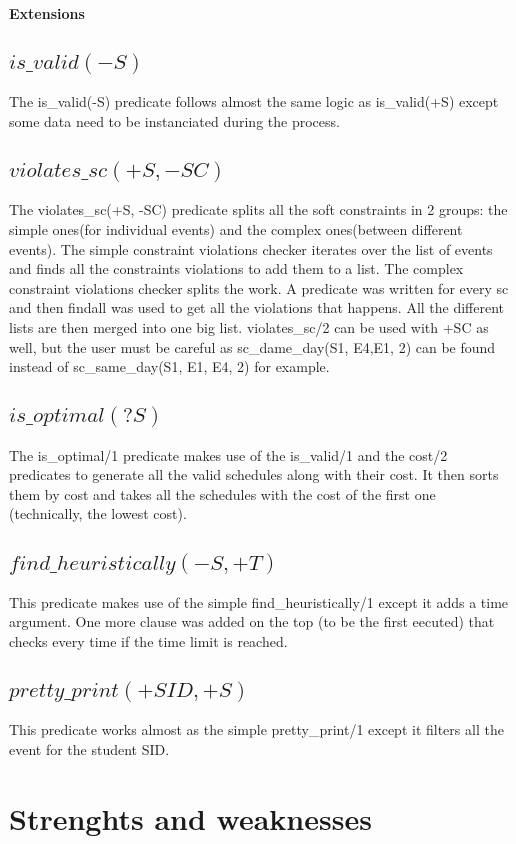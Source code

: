 \documentclass[a4paper]{article}
\begin{document}
\textbf{Extensions}

\subsection{$is\_valid(-S)$}
The is\_valid(-S) predicate follows almost the same logic as is\_valid(+S) except some data need to be instanciated during the process.
\subsection{$violates\_sc(+S, -SC)$}
The violates\_sc(+S, -SC) predicate splits all the soft constraints in 2 groups: the simple ones(for individual events) and the complex ones(between different events).
The simple constraint violations checker iterates over the list of events and finds all the constraints violations to add them to a list. The complex constraint violations checker splits the work. A predicate was written for every sc and then findall was used to get all the violations that happens. All the different lists are then merged into one big list. 
violates\_sc/2 can be used with +SC as well, but the user must be careful as sc_dame_day(S1, E4,E1, 2) can be found instead of sc_same_day(S1, E1, E4, 2) for example.
\subsection{$is\_optimal(?S)$}
The is\_optimal/1 predicate makes use of the is\_valid/1 and the cost/2 predicates to generate all the valid schedules along with their cost. It then sorts them by cost and takes all the schedules with the cost of the first one (technically, the lowest cost).
\subsection{$find\_heuristically(-S, +T)$}
This predicate makes use of the simple find\_heuristically/1 except it adds a time argument. One more clause was added on the top (to be the first eecuted) that checks every time if the time limit is reached.
\subsection{$pretty\_print(+SID, +S)$}
This predicate works almost as the simple pretty\_print/1 except it filters all the event for the student SID.


\section{Strenghts and weaknesses}
\end{document}
